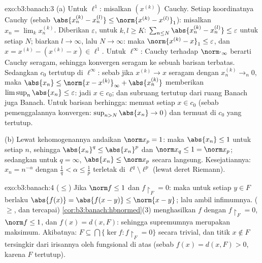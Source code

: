 \begin{solution}{exo:b3:banach:3}
(a) Untuk $\ell^1$: misalkan $(x^{(k)})$ Cauchy. Setiap koordinatnya
Cauchy (sebab $\abs{x^{(k)}_n - x^{(l)}_n} \leq \norm{x^{(k)} -
x^{(l)}}_1$): misalkan $x_n = \lim_kx^{(k)}_n$. Diberikan $\varepsilon$,
untuk $k, l \geq K$: $\sum_{n \leq N}\abs{x^{(k)}_n - x^{(l)}_n}
\leq \varepsilon$ untuk setiap $N$; biarkan $l \to \infty$, lalu $N \to
\infty$: maka $\norm{x^{(k)} - x}_1 \leq \varepsilon$, dan $x =
x^{(k)} - (x^{(k)} - x) \in \ell^1$. Untuk $\ell^\infty$: Cauchy terhadap
$\norm\cdot_\infty$ berarti Cauchy seragam, sehingga konvergen seragam ke
sebuah barisan terbatas. Sedangkan $c_0$ tertutup di $\ell^\infty$: sebab jika
$x^{(k)} \to x$ seragam dengan $x^{(k)}_n \to_n 0$, maka
$\abs{x_n} \leq \norm{x - x^{(k)}}_\infty + \abs{x^{(k)}_n}$
memberikan $\limsup_n\abs{x_n} \leq \varepsilon$: jadi $x \in c_0$; dan
subruang tertutup dari ruang Banach juga Banach. Untuk barisan berhingga:
 memuat setiap $x \in c_0$ (sebab pemenggalannya konvergen:
$\sup_{n>N}\abs{x_n} \to 0$) dan termuat di $c_0$ yang tertutup.

(b) Lewat kehomogenannya andaikan $\norm x_p = 1$: maka $\abs{x_n} \leq
1$ untuk setiap $n$, sehingga $\abs{x_n}^q \leq \abs{x_n}^p$ dan $\norm
x_q \leq 1 = \norm x_p$; sedangkan untuk $q = \infty$, $\abs{x_n} \leq
\norm x_p$ secara langsung. Kesejatiannya: $x_n = n^{-\alpha}$ dengan
$\frac1q < \alpha \leq \frac1p$ terletak di $\ell^q \setminus
\ell^p$ (lewat deret Riemann).
\end{solution}

\begin{solution}{exo:b3:banach:4}
($\leq$) Jika $\norm f \leq 1$ dan $f\restriction_F = 0$: maka untuk
setiap $y \in F$ berlaku $\abs{f(x)} = \abs{f(x - y)} \leq \norm{x -
y}$; lalu ambil infimumnya. ($\geq$, dan tercapai)
\cref{cor:b3:banach:hbnormed}(3) menghasilkan $f$ dengan
$f\restriction_F = 0$, $\norm f \leq 1$, dan $f(x) = d(x, F)$: sehingga
supremumnya merupakan maksimum. Akibatnya: $F \subseteq \bigcap\{\ker
f : f\restriction_F = 0\}$ secara trivial, dan titik $x \notin F$
tersingkir dari irisannya oleh fungsional di atas
(sebab $f(x) = d(x,F) > 0$, karena $F$ tertutup).
\end{solution}

